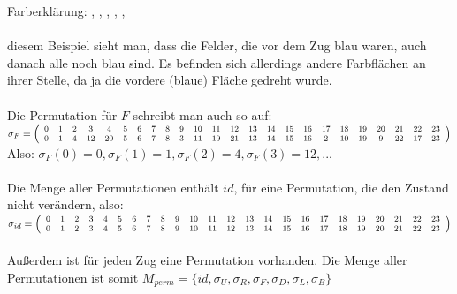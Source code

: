 \documentclass[12pt,a4paper, usenames, dvipsnames]{scrartcl}
\begin{document}
Farberklärung: \color{gray}{weiß}, \color{blue}{blau}, \color{ForestGreen}{grün}, \color{orange}{orange}, \color{black}{gelb}, \color{red}{rot}\\
\\
\color{black}{An} diesem Beispiel sieht man, dass die Felder, die vor dem Zug blau waren, auch danach alle noch blau sind. Es befinden sich allerdings andere Farbflächen an ihrer Stelle, da ja die vordere (blaue) Fläche gedreht wurde. \\
\\
Die Permutation für $F$ schreibt man auch so auf: \\
$\footnotesize
\sigma_F=
\left( \begin{array}{cccccccccccccccccccccccc}
0 & 1 & 2 & 3 & 4 & 5 & 6 & 7 & 8 & 9 & 10 & 11 & 12 & 13 & 14 & 15 & 16 & 17 &  18 & 19 & 20 & 21 &22 & 23 \\                                           
0 & 1 & 4 & 12 & 20 & 5 & 6 & 7 & 8 & 3 & 11 & 19 & 21 & 13 & 14 & 15 & 16 & 2 & 10 & 19 & 9 & 22 & 17 & 23 \\
\end{array}\right)$
Also: $\sigma_F(0) =0, \sigma_F(1)= 1, \sigma_F(2)=4, \sigma_F(3)=12,...$ \\
\\
Die Menge aller Permutationen enthält $id$, für eine Permutation, die den Zustand nicht verändern, also: \\
$\footnotesize
\sigma_{id}=
\left( \begin{array}{cccccccccccccccccccccccc}
0 & 1 & 2 & 3 & 4 & 5 & 6 & 7 & 8 & 9 & 10 & 11 & 12 & 13 & 14 & 15 & 16 & 17 &  18 & 19 & 20 & 21 &22 & 23 \\                                           
0 & 1 & 2 & 3 & 4 & 5 & 6 & 7 & 8 & 9 & 10 & 11 & 12 & 13 & 14 & 15 & 16 & 17 &  18 & 19 & 20 & 21 &22 & 23 \\                                           
\end{array}\right)$
\\
\\
Außerdem ist für jeden Zug eine Permutation vorhanden. Die Menge aller Permutationen ist somit $M_{perm} = \lbrace id, \sigma_U, \sigma_R, \sigma_F, \sigma_D, \sigma_L, \sigma_B \rbrace$


\end{document}
